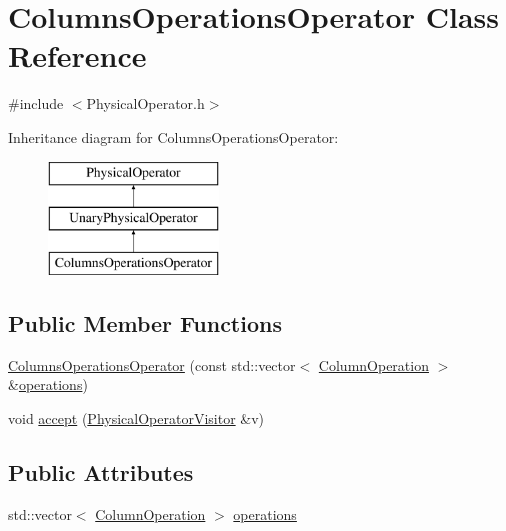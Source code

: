 \hypertarget{class_columns_operations_operator}{\section{Columns\+Operations\+Operator Class Reference}
\label{class_columns_operations_operator}
}


{\ttfamily \#include $<$Physical\+Operator.\+h$>$}

Inheritance diagram for Columns\+Operations\+Operator\+:\begin{figure}[H]
\begin{center}
\leavevmode
\includegraphics[height=3.000000cm]{class_columns_operations_operator}
\end{center}
\end{figure}
\subsection*{Public Member Functions}
\begin{DoxyCompactItemize}
\item 
\hyperlink{class_columns_operations_operator_a19cb4f96df418cd1a94a4906da06e20d}{Columns\+Operations\+Operator} (const std\+::vector$<$ \hyperlink{class_column_operation}{Column\+Operation} $>$ \&\hyperlink{class_columns_operations_operator_ae2384aeda586f5c60013dbe0cb5a3030}{operations})
\item 
void \hyperlink{class_columns_operations_operator_a5d40e806cb9dbd2969b45c28d7729f76}{accept} (\hyperlink{class_physical_operator_visitor}{Physical\+Operator\+Visitor} \&v)
\end{DoxyCompactItemize}
\subsection*{Public Attributes}
\begin{DoxyCompactItemize}
\item 
std\+::vector$<$ \hyperlink{class_column_operation}{Column\+Operation} $>$ \hyperlink{class_columns_operations_operator_ae2384aeda586f5c60013dbe0cb5a3030}{operations}
\end{DoxyCompactItemize}


